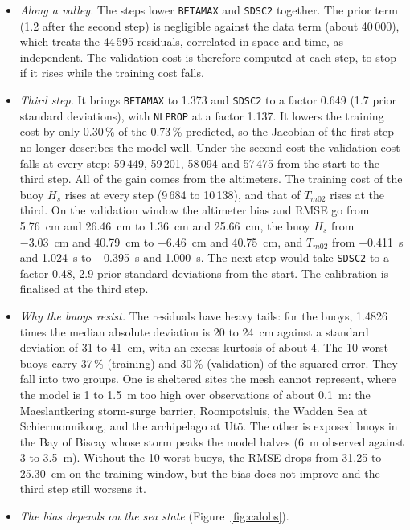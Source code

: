\documentclass[11pt,a4paper]{article}
\begin{document}
\begin{itemize}
buoy $H_s$ becomes \SI{-6.50}{cm} and \SI{31.65}{cm}, and $T_{m02}$
\SI{-0.421}{s} and \SI{0.966}{s}, with the interpolation.
\item \emph{Along a valley.} The steps lower \texttt{BETAMAX} and
\texttt{SDSC2} together. The prior term (1.2 after the second step) is
negligible against the data term (about 40\,000), which treats the
44\,595 residuals, correlated in space and time, as independent. The
validation cost is therefore computed at each step, to stop if it rises
while the training cost falls.
\item \emph{Third step.} It brings \texttt{BETAMAX} to 1.373 and
\texttt{SDSC2} to a factor 0.649 (1.7 prior standard deviations), with
\texttt{NLPROP} at a factor 1.137. It lowers the training cost by only
0.30\,\% of the 0.73\,\% predicted, so the Jacobian of the first step no
longer describes the model well. Under the second cost the validation
cost falls at every step: 59\,449, 59\,201, 58\,094 and 57\,475 from the
start to the third step. All of the gain comes from the altimeters. The
training cost of the buoy $H_s$ rises at every step (9\,684 to 10\,138),
and that of $T_{m02}$ rises at the third. On the validation window the
altimeter bias and RMSE go from \SI{+5.76}{cm} and \SI{26.46}{cm} to
\SI{+1.36}{cm} and \SI{25.66}{cm}, the buoy $H_s$ from \SI{-3.03}{cm}
and \SI{40.79}{cm} to \SI{-6.46}{cm} and \SI{40.75}{cm}, and $T_{m02}$
from \SI{-0.411}{s} and \SI{1.024}{s} to \SI{-0.395}{s} and
\SI{1.000}{s}. The next step would take \texttt{SDSC2} to a factor 0.48,
2.9 prior standard deviations from the start. The calibration is
finalised at the third step.
\item \emph{Why the buoys resist.} The residuals have heavy tails: for
the buoys, 1.4826 times the median absolute deviation is 20 to
\SI{24}{cm} against a standard deviation of 31 to \SI{41}{cm}, with an
excess kurtosis of about 4. The 10 worst buoys carry 37\,\% (training)
and 30\,\% (validation) of the squared error. They fall into two groups.
One is sheltered sites the mesh cannot represent, where the model is 1 to
\SI{1.5}{m} too high over observations of about \SI{0.1}{m}: the
Maeslantkering storm-surge barrier, Roompotsluis, the Wadden Sea at
Schiermonnikoog, and the archipelago at Ut\"o. The other is exposed buoys
in the Bay of Biscay whose storm peaks the model halves (\SI{6}{m}
observed against 3 to \SI{3.5}{m}). Without the 10 worst buoys, the RMSE
drops from 31.25 to \SI{25.30}{cm} on the training window, but the bias
does not improve and the third step still worsens it.
\item \emph{The bias depends on the sea state} (Figure~\ref{fig:calobs}).

\end{itemize}
\end{document}
